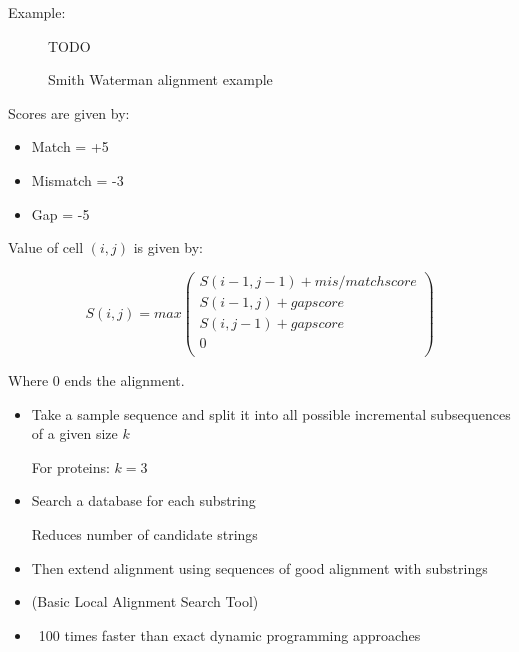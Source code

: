 \documentclass[a4paper]{article}
\begin{document}
Example:

\begin{figure}[h!]
  \centering
  TODO
  \caption{Smith Waterman alignment example}
  \label{fig:sw_alignment_eg}
\end{figure}
\FloatBarrier

Scores are given by:

\begin{itemize}
  \item Match = +5
  \item Mismatch = -3
  \item Gap = -5
\end{itemize}

Value of cell $(i, j)$ is given by:

\[
  S(i, j) = max
    \left (
    \begin{array}{ll}
      S(i-1, j-1) + mis/match score \\
      S(i-1, j) + gap score \\
      S(i, j-1) + gap score \\
      0 \\
    \end{array}
    \right )
\]

Where 0 ends the alignment.


\begin{itemize}
  \item
    Take a sample sequence and split it into all possible incremental
    subsequences of a given size $k$

    For proteins: $k = 3$

  \item
    Search a database for each substring

    Reduces number of candidate strings

  \item
    Then extend alignment using sequences of good alignment with substrings
\end{itemize}


\begin{itemize}
  \item
    (Basic Local Alignment Search Tool)

  \item
    ~100 times faster than exact dynamic programming approaches
\end{itemize}
\end{document}
